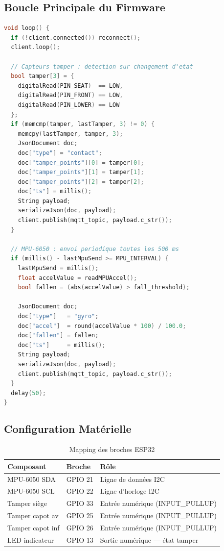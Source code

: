 \documentclass[12pt, a4paper]{report}
\begin{document}
\subsection{Boucle Principale du Firmware}

\begin{lstlisting}[language=C++, caption={Boucle principale --- Gestion MQTT et capteurs}]
void loop() {
  if (!client.connected()) reconnect();
  client.loop();

  // Capteurs tamper : detection sur changement d'etat
  bool tamper[3] = {
    digitalRead(PIN_SEAT)  == LOW,
    digitalRead(PIN_FRONT) == LOW,
    digitalRead(PIN_LOWER) == LOW
  };
  if (memcmp(tamper, lastTamper, 3) != 0) {
    memcpy(lastTamper, tamper, 3);
    JsonDocument doc;
    doc["type"] = "contact";
    doc["tamper_points"][0] = tamper[0];
    doc["tamper_points"][1] = tamper[1];
    doc["tamper_points"][2] = tamper[2];
    doc["ts"] = millis();
    String payload;
    serializeJson(doc, payload);
    client.publish(mqtt_topic, payload.c_str());
  }

  // MPU-6050 : envoi periodique toutes les 500 ms
  if (millis() - lastMpuSend >= MPU_INTERVAL) {
    lastMpuSend = millis();
    float accelValue = readMPUAccel();
    bool fallen = (abs(accelValue) > fall_threshold);

    JsonDocument doc;
    doc["type"]   = "gyro";
    doc["accel"]  = round(accelValue * 100) / 100.0;
    doc["fallen"] = fallen;
    doc["ts"]     = millis();
    String payload;
    serializeJson(doc, payload);
    client.publish(mqtt_topic, payload.c_str());
  }
  delay(50);
}
\end{lstlisting}

\subsection{Configuration Matérielle}

\begin{table}[H]
  \centering
  \caption{Mapping des broches ESP32}
  \label{tab:pinout}
  \renewcommand{\arraystretch}{1.4}
  \begin{tabularx}{\textwidth}{|p{2.5cm}|p{2cm}|X|}
    \hline
    \rowcolor{isimablue!20}
    \textbf{Composant} & \textbf{Broche} & \textbf{Rôle} \\
    \hline
    MPU-6050 SDA    & GPIO 21 & Ligne de données I2C \\
    \hline
    MPU-6050 SCL    & GPIO 22 & Ligne d'horloge I2C \\
    \hline
    Tamper siège    & GPIO 33 & Entrée numérique (INPUT\_PULLUP) \\
    \hline
    Tamper capot av & GPIO 25 & Entrée numérique (INPUT\_PULLUP) \\
    \hline
    Tamper capot inf& GPIO 26 & Entrée numérique (INPUT\_PULLUP) \\
    \hline
    LED indicateur  & GPIO 13 & Sortie numérique --- état tamper \\
    \hline
  \end{tabularx}
\end{table}
\end{document}
